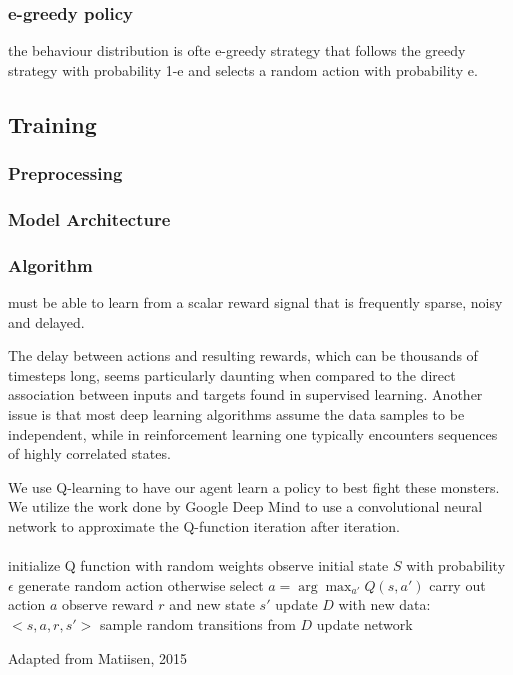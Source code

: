 \documentclass{article}
\begin{document}
\begin{multicols}{2}
\subsubsection{e-greedy policy}

the behaviour distribution is ofte e-greedy strategy that follows the greedy strategy with probability 1-e and selects a random action with probability e.


\subsection{Training}

\subsubsection{Preprocessing}

\subsubsection{Model Architecture}

\subsubsection{Algorithm}

must be able to learn from a scalar reward signal that is frequently sparse, noisy and delayed.

The delay between actions and resulting rewards, which can be thousands of timesteps long, seems particularly daunting when compared to the direct association between inputs and targets found in supervised learning. Another issue is that most deep learning algorithms assume the data samples to be independent, while in reinforcement learning one typically encounters sequences of highly correlated states.


We use Q-learning to have our agent learn a policy to best fight these monsters.
We utilize the work done by Google Deep Mind to use a convolutional neural network to approximate the Q-function iteration after iteration.
\paragraph{}


\begin{algorithm*}[H]
     \SetAlgoLined
     initialize Q function with random weights \;
     observe initial state $S$ \;
      {
        with probability $\epsilon$ generate random action \;
        otherwise select $a = \arg\max_{a'} Q(s,a')$ \;
        carry out action $a$ \;
        observe reward $r$ and new state $s'$ \;
        update $D$ with new data: $<s,a,r,s'>$ \;
        sample random transitions from $D$ \;
        update network \;
     }
     \caption{Adapted from Matiisen, 2015}
\end{algorithm*}


\end{multicols}
\end{document}
